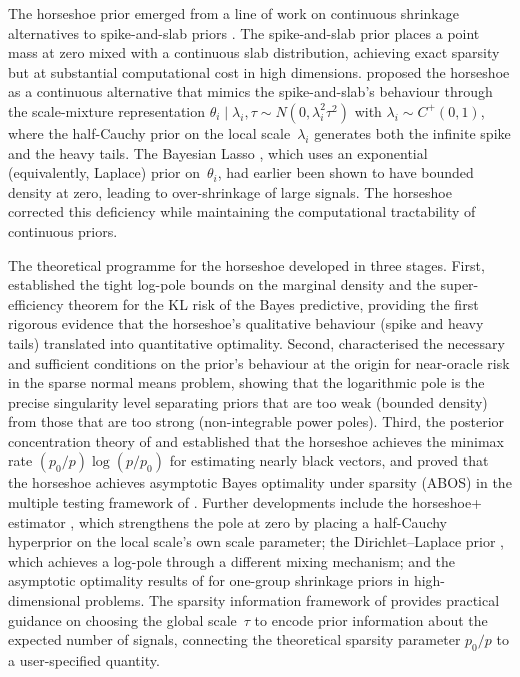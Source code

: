 \documentclass[12pt]{article}
\begin{document}
The horseshoe prior emerged from a line of work on continuous shrinkage alternatives to spike-and-slab priors \citep{mitchell1988bayesian}. The spike-and-slab prior places a point mass at zero mixed with a continuous slab distribution, achieving exact sparsity but at substantial computational cost in high dimensions. \citet{carvalho2009handling} proposed the horseshoe as a continuous alternative that mimics the spike-and-slab's behaviour through the scale-mixture representation $\theta_i \mid \lambda_i, \tau \sim N(0, \lambda_i^2 \tau^2)$ with $\lambda_i \sim C^+(0,1)$, where the half-Cauchy prior on the local scale~$\lambda_i$ generates both the infinite spike and the heavy tails. The Bayesian Lasso \citep{park2008bayesian}, which uses an exponential (equivalently, Laplace) prior on~$\theta_i$, had earlier been shown to have bounded density at zero, leading to over-shrinkage of large signals. The horseshoe corrected this deficiency while maintaining the computational tractability of continuous priors.

The theoretical programme for the horseshoe developed in three stages. First, \citet{carvalho2010horseshoe} established the tight log-pole bounds on the marginal density and the super-efficiency theorem for the KL risk of the Bayes predictive, providing the first rigorous evidence that the horseshoe's qualitative behaviour (spike and heavy tails) translated into quantitative optimality. Second, \citet{polson2010shrink} characterised the necessary and sufficient conditions on the prior's behaviour at the origin for near-oracle risk in the sparse normal means problem, showing that the logarithmic pole is the precise singularity level separating priors that are too weak (bounded density) from those that are too strong (non-integrable power poles). Third, the posterior concentration theory of \citet{vanderpas2014horseshoe} and \citet{vanderpas2016conditions} established that the horseshoe achieves the minimax rate $(p_0/p)\log(p/p_0)$ for estimating nearly black vectors, and \citet{datta2013asymptotic} proved that the horseshoe achieves asymptotic Bayes optimality under sparsity (ABOS) in the multiple testing framework of \citet{bogdan2011asymptotic}. Further developments include the horseshoe+ estimator \citep{bhadra2017horseshoe}, which strengthens the pole at zero by placing a half-Cauchy hyperprior on the local scale's own scale parameter; the Dirichlet--Laplace prior \citep{bhattacharya2015dirichlet}, which achieves a log-pole through a different mixing mechanism; and the asymptotic optimality results of \citet{ghosh2017asymptotic} for one-group shrinkage priors in high-dimensional problems. The sparsity information framework of \citet{piironen2017sparsity} provides practical guidance on choosing the global scale~$\tau$ to encode prior information about the expected number of signals, connecting the theoretical sparsity parameter $p_0/p$ to a user-specified quantity.
\end{document}
